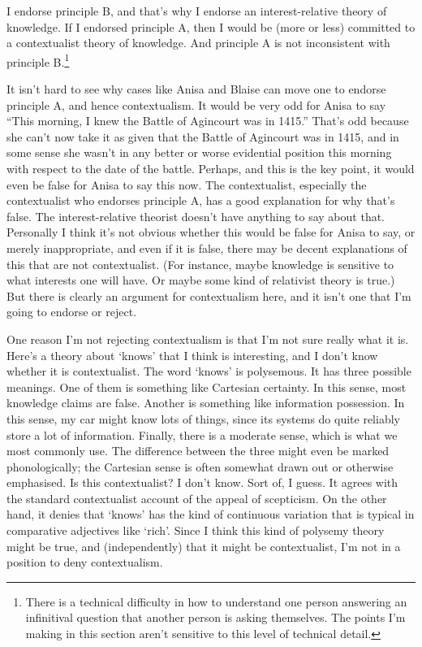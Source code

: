 \documentclass[
  10pt,
  letterpaper,
  twoside]{scrbook}
\begin{document}
I endorse principle B, and that's why I endorse an interest-relative
theory of knowledge. If I endorsed principle A, then I would be (more or
less) committed to a contextualist theory of knowledge. And principle A
is not inconsistent with principle B.\footnote{There is a technical
  difficulty in how to understand one person answering an infinitival
  question that another person is asking themselves. The points I'm
  making in this section aren't sensitive to this level of technical
  detail.}

It isn't hard to see why cases like Anisa and Blaise can move one to
endorse principle A, and hence contextualism. It would be very odd for
Anisa to say ``This morning, I knew the Battle of Agincourt was in
1415.'' That's odd because she can't now take it as given that the
Battle of Agincourt was in 1415, and in some sense she wasn't in any
better or worse evidential position this morning with respect to the
date of the battle. Perhaps, and this is the key point, it would even be
false for Anisa to say this now. The contextualist, especially the
contextualist who endorses principle A, has a good explanation for why
that's false. The interest-relative theorist doesn't have anything to
say about that. Personally I think it's not obvious whether this would
be false for Anisa to say, or merely inappropriate, and even if it is
false, there may be decent explanations of this that are not
contextualist. (For instance, maybe knowledge is sensitive to what
interests one will have. Or maybe some kind of relativist theory is
true.) But there is clearly an argument for contextualism here, and it
isn't one that I'm going to endorse or reject.

One reason I'm not rejecting contextualism is that I'm not sure really
what it is. Here's a theory about `knows' that I think is interesting,
and I don't know whether it is contextualist. The word `knows' is
polysemous. It has three possible meanings. One of them is something
like Cartesian certainty. In this sense, most knowledge claims are
false. Another is something like information possession. In this sense,
my car might know lots of things, since its systems do quite reliably
store a lot of information. Finally, there is a moderate sense, which is
what we most commonly use. The difference between the three might even
be marked phonologically; the Cartesian sense is often somewhat drawn
out or otherwise emphasised. Is this contextualist? I don't know. Sort
of, I guess. It agrees with the standard contextualist account of the
appeal of scepticism. On the other hand, it denies that `knows' has the
kind of continuous variation that is typical in comparative adjectives
like `rich'. Since I think this kind of polysemy theory might be true,
and (independently) that it might be contextualist, I'm not in a
position to deny contextualism.
\end{document}
